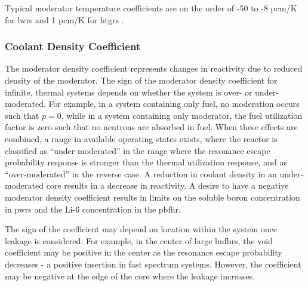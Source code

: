 


Typical moderator temperature coefficients are on the order of -50 to -8 pcm/K for \glspl{lwr} and 1 pcm/K for \glspl{htgr} \cite{duderstadt}. 

\subsubsection{Coolant Density Coefficient}
\label{sec:CoolantDensityCoeff}
The moderator density coefficient represents changes in reactivity due to reduced density of the moderator. The sign of the moderator density coefficient for infinite, thermal systems depends on whether the system is over- or under-moderated. For example, in a system containing only fuel, no moderation occurs such that \(p=0\), while in a system containing only moderator, the fuel utilization factor is zero such that no neutrons are absorbed in fuel. When these effects are combined, a range in available operating states exists, where the reactor is classified as ``under-moderated'' in the range where the resonance escape probability response is stronger than the thermal utilization response, and as ``over-moderated'' in the reverse case. A reduction in coolant density in an under-moderated core results in a decrease in reactivity. A desire to have a negative moderator density coefficient results in limits on the soluble boron concentration in \glspl{pwr} and the Li-6 concentration in the \gls{pbfhr}. 

The sign of the coefficient may depend on location within the system once leakage is considered. For example, in the center of large \glspl{lmfbr}, the void coefficient may be positive in the center as the resonance escape probability decreases - a positive insertion in fast spectrum systems. However, the coefficient may be negative at the edge of the core where the leakage increases. 


